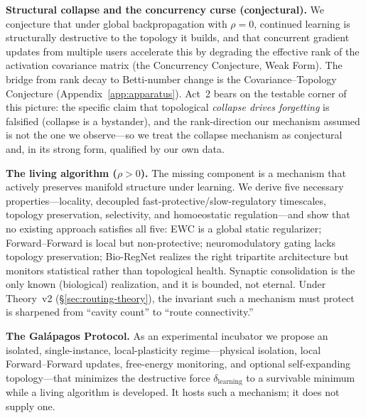 \documentclass{article}
\begin{document}
\medskip
\noindent\textbf{Structural collapse and the concurrency curse (conjectural).} We conjecture that
under global backpropagation with $\rho = 0$, continued learning is structurally destructive to the
topology it builds, and that concurrent gradient updates from multiple users accelerate this by
degrading the effective rank of the activation covariance matrix (the Concurrency Conjecture, Weak
Form). The bridge from rank decay to Betti-number change is the Covariance--Topology Conjecture
(Appendix~\ref{app:apparatus}). Act~2 bears on the testable corner of this picture: the specific
claim that topological \emph{collapse drives forgetting} is falsified (collapse is a bystander), and
the rank-direction our mechanism assumed is not the one we observe---so we treat the collapse
mechanism as conjectural and, in its strong form, qualified by our own data.

\medskip
\noindent\textbf{The living algorithm ($\rho > 0$).} The missing component is a mechanism that
actively preserves manifold structure under learning. We derive five necessary properties---locality,
decoupled fast-protective/slow-regulatory timescales, topology preservation, selectivity, and
homoeostatic regulation---and show that no existing approach satisfies all five: EWC is a global
static regularizer; Forward--Forward is local but non-protective; neuromodulatory gating lacks
topology preservation; Bio-RegNet realizes the right tripartite architecture but monitors statistical
rather than topological health. Synaptic consolidation is the only known (biological) realization,
and it is bounded, not eternal. Under Theory~v2 (\S\ref{sec:routing-theory}), the invariant such a
mechanism must protect is sharpened from ``cavity count'' to ``route connectivity.''

\medskip
\noindent\textbf{The Gal\'apagos Protocol.} As an experimental incubator we propose an isolated,
single-instance, local-plasticity regime---physical isolation, local Forward--Forward updates,
free-energy monitoring, and optional self-expanding topology---that minimizes the destructive force
$\delta_{\text{learning}}$ to a survivable minimum while a living algorithm is developed. It hosts
such a mechanism; it does not supply one.
\end{document}
